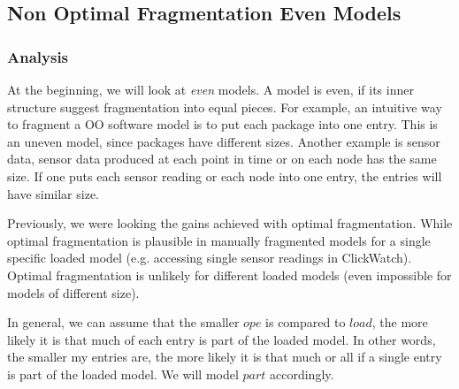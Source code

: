\subsection{Non Optimal Fragmentation Even Models}

\subsubsection{Analysis}

At the beginning, we will look at \emph{even} models. A model is even, if its inner structure suggest fragmentation into equal pieces. For example, an intuitive way to fragment a OO software model is to put each package into one entry. This is an uneven model, since packages have different sizes. Another example is sensor data, sensor data produced at each point in time or on each node has the same size. If one puts each sensor reading or each node into one entry, the entries will have similar size.

Previously, we were looking the gains achieved with optimal fragmentation. While optimal fragmentation is plausible in manually fragmented models for a single specific loaded model (e.g. accessing single sensor readings in ClickWatch). Optimal fragmentation is unlikely for different loaded models (even impossible for models of different size). 

In general, we can assume that the smaller $ope$ is compared to $load$, the more likely it is that much of each entry is part of the loaded model. In other words, the smaller my entries are, the more likely it is that much or all if a single entry is part of the loaded model. We will model $part$  accordingly.